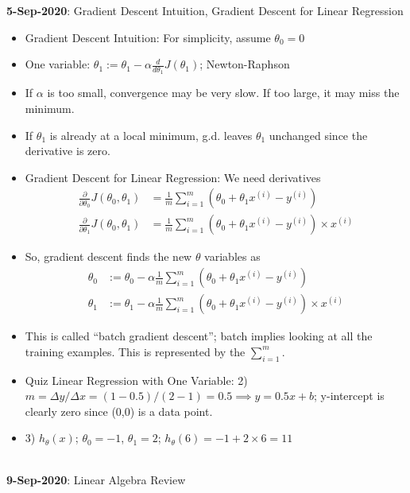 \documentclass[10pt]{article}
\begin{document}
{\large \textbf{5-Sep-2020}: Gradient Descent Intuition, Gradient Descent for Linear Regression}
\begin{itemize}
  \item Gradient Descent Intuition: For simplicity, assume $\theta_0=0$
  \item One variable: $\theta_1 := \theta_1 - \alpha \frac{d}{d \theta_1}J(\theta_1)$; Newton-Raphson
  \item If $\alpha$ is too small, convergence may be very slow. If too large, it may miss the minimum.
  \item If $\theta_1$ is already at a local minimum, g.d. leaves $\theta_1$ unchanged since the derivative is zero.
  \item Gradient Descent for Linear Regression: We need derivatives
    \begin{align*}
      \frac{ \partial }{\partial \theta_0} J(\theta_0, \theta_1) &= \frac{1}{m} \sum_{i=1}^m \left( \theta_0 + \theta_1 x^{(i)} - y^{(i)}\right) \\
      \frac{ \partial }{\partial \theta_1} J(\theta_0, \theta_1) &= \frac{1}{m} \sum_{i=1}^m \left( \theta_0 + \theta_1 x^{(i)} - y^{(i)}\right) \times x^{(i)}
    \end{align*}
  \item So, gradient descent finds the new $\theta$ variables as
    \begin{align*}
      \theta_0 &:= \theta_0 - \alpha \frac{1}{m} \sum_{i=1}^m \left( \theta_0 + \theta_1x^{(i)} - y^{(i)} \right)\\
      \theta_1 &:= \theta_1 - \alpha \frac{1}{m} \sum_{i=1}^m \left( \theta_0 + \theta_1x^{(i)} - y^{(i)} \right) \times x^{(i)}
    \end{align*}
  \item This is called ``batch gradient descent''; batch implies looking at all the training examples. This is represented by the $\sum_{i=1}^m$.
  \item Quiz Linear Regression with One Variable: 2) $m= \Delta y/ \Delta x = (1-0.5)/(2-1) = 0.5 \implies y=0.5x + b$; y-intercept is clearly zero since (0,0) is a data point.
  \item 3) $h_{\theta}(x)$; $\theta_0=-1$, $\theta_1=2$; $h_{\theta}(6) = -1 + 2 \times 6 = 11$
\end{itemize}
\hfill \\
{\large \textbf{9-Sep-2020}: Linear Algebra Review}
\end{document}
